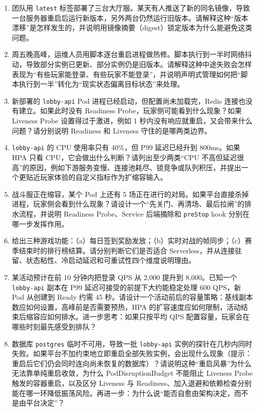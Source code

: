 \begin{tcolorbox}[breakable]
\begin{enumerate}
  \item 团队用 \texttt{latest} 标签部署了三台大厅服。某天有人推送了新的同名镜像，导致一台服务器重启后运行新版本，另外两台仍然运行旧版本。请解释这种“版本漂移”是怎样发生的，并说明用镜像摘要（digest）锁定版本为什么能避免这类问题。

    \item 周五晚高峰，运维人员用脚本逐台重启进程做热修。脚本执行到一半时网络抖动，导致部分实例已更新、部分实例仍是旧版本。请解释这种中途失败会怎样表现为“有些玩家能登录、有些玩家不能登录”，并说明声明式管理如何把“脚本执行到一半”转化为“现实状态偏离目标状态”来处理。

    \item 新部署的 \texttt{lobby-api} Pod 进程已经启动，但配置尚未加载完，Redis 连接也没有建立。如果此时没有 Readiness Probe，玩家侧可能看到什么现象？如果 Liveness Probe 设置得过于激进，例如 1 秒内没有响应就重启，又会带来什么问题？请分别说明 Readiness 和 Liveness 守住的是哪两类边界。

    \item \texttt{lobby-api} 的 CPU 使用率只有 40\%，但 P99 延迟已经升到 800ms。如果 HPA 只看 CPU，它会做出什么判断？请列出至少两类“CPU 不高但延迟很高”的原因，例如下游服务变慢、连接池耗尽、锁竞争或队列积压，并提出一个更贴近玩家体验的自定义指标作为扩缩容输入。

    \item 战斗服正在缩容，某个 Pod 上还有 5 场正在进行的对局。如果平台直接杀掉进程，玩家侧会看到什么现象？请设计一个“先关门、再清场、最后拉闸”的排水流程，并说明 Readiness Probe、Service 后端摘除和 \texttt{preStop} hook 分别在哪一步发挥作用。

    \item 给出三种游戏功能：（a）每日签到奖励发放；（b）实时对战的帧同步；（c）赛季结束时的排行榜结算。请分别判断它们是否适合 Serverless，并从连接驻留、状态粘性、冷启动延迟和可重试性四个维度说明理由。

    \item 某活动预计在前 10 分钟内把登录 QPS 从 2,000 提升到 8,000。已知一个 \texttt{lobby-api} 副本在 P99 延迟可接受的前提下大约能稳定处理 600 QPS，新 Pod 从创建到 Ready 约需 45 秒。请设计一个活动前后的容量策略：基线副本数应如何设置，高峰前是否需要预热，HPA 的扩容速度应如何限制，活动结束后缩容应如何排水。进一步思考：如果只按平均 QPS 配置容量，玩家会在哪些时刻最先感受到排队？

    \item 数据库 \texttt{postgres} 临时不可用，导致一批 \texttt{lobby-api} 实例的探针在几秒内同时失败。如果平台不加约束地立即重启全部失败实例，会出现什么现象（提示：重启后它们仍会同时连向尚未恢复的数据库）？请说明这种“重启风暴”为什么无法靠单纯重启收敛，为什么 PodDisruptionBudget 不能阻止 Liveness Probe 触发的容器重启，以及区分 Liveness 与 Readiness、加入退避和依赖检查分别能在哪一环降低振荡风险。再进一步：为什么说“能否自愈由架构决定，而不是由平台决定”？


\end{enumerate}
\end{tcolorbox}
